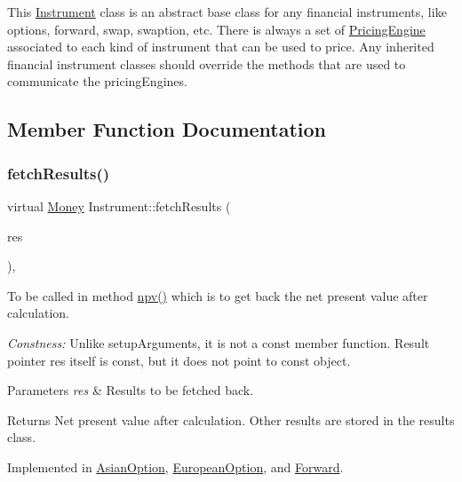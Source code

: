 This \hyperlink{class_instrument}{Instrument} class is an abstract base class for any financial instruments, like options, forward, swap, swaption, etc. There is always a set of \hyperlink{class_pricing_engine}{Pricing\+Engine} associated to each kind of instrument that can be used to price. Any inherited financial instrument classes should override the methods that are used to communicate the pricing\+Engines. 

\subsection{Member Function Documentation}
\hypertarget{class_instrument_a381f093402f789ad7c0ffecd233167dc}{}\label{class_instrument_a381f093402f789ad7c0ffecd233167dc} 
\subsubsection{\texorpdfstring{fetch\+Results()}{fetchResults()}}
{\footnotesize\ttfamily virtual \hyperlink{_name_def_8h_a5a9d48c16a694e9a2d9f1eca730dc8c5}{Money} Instrument\+::fetch\+Results (\begin{DoxyParamCaption}\item[{\hyperlink{class_pricing_engine_1_1_results}{Pricing\+Engine\+::\+Results} $\ast$const}]{res }\end{DoxyParamCaption})\hspace{0.3cm}{\ttfamily [protected]}, {}}



To be called in method \hyperlink{class_instrument_aa750f2ae95a21d65a073da3171e8d084}{npv()} which is to get back the net present value after calculation. 

{\itshape Constness\+:} Unlike setup\+Arguments, it is not a const member function. Result pointer res itself is const, but it does not point to const object. 
\begin{DoxyParams}{Parameters}
{\em res} & Results to be fetched back. \\
\hline
\end{DoxyParams}
\begin{DoxyReturn}{Returns}
Net present value after calculation. Other results are stored in the results class. 
\end{DoxyReturn}


Implemented in \hyperlink{class_asian_option_a99cd9956b73d99a64748c913dcccd6ea}{Asian\+Option}, \hyperlink{class_european_option_ae234d562ef21dc24c25f1538860da1cf}{European\+Option}, and \hyperlink{class_forward_ab1e2edeb8345c8605013634a598d1ae5}{Forward}.


